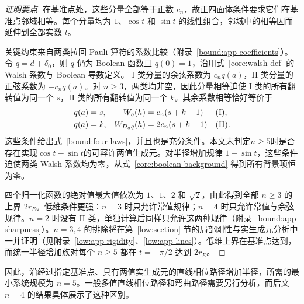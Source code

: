 \begin{proof}[证明要点]
在基准点处，这些分量全部等于正数 $c_n$，故正四面体条件要求它们在基准点邻域相等。每个分量均为 $1$、$\cos t$ 和 $\sin t$ 的线性组合，邻域中的相等因而延伸到全部实数 $t$。

关键约束来自两类拉回 Pauli 算符的系数比较（附录~\ref{bound:app-coefficients}）。令 $q=d+\delta_0$，则 $q$ 仍为 Boolean 函数且 $q(0)=1$，沿用式~\eqref{core:walsh-def} 的 Walsh 系数与 Boolean 导数定义。
I 类分量的余弦系数为 $c_nq(a)$，II 类分量的正弦系数为 $-c_nq(a)$。对 $n\ge3$，两类均非空，因此分量相等迫使 I 类的所有翻转值为同一个 $s$，II 类的所有翻转值为同一个 $k$。其余系数相等恰好等价于
\begin{equation}
 \begin{aligned}
 q(a)&=s,& W_q(h)&=c_n(s+k-1)&&({\rm I}),\\
 q(a)&=k,& W_{D_aq}(h)&=2c_n(s+k-1)&&({\rm II}).
 \end{aligned}
 \label{bound:conditions}
\end{equation}
这些条件给出式~\eqref{bound:four-laws}，并且也是充分条件。本文未判定$n\ge5$时是否存在实现$\cos t-\sin t$的可容许两值生成元。对半径增加规律 $1-\sin t$，这些条件迫使两类 Walsh 系数均为零，从式~\eqref{core:boolean-background} 得到所有背景项恒为零。

四个归一化函数的绝对值最大值依次为 $1$、$1$、$2$ 和 $\sqrt2$，由此得到全部 $n\ge3$ 的上界 $2r_E$。低维条件更强：$n=3$ 时只允许常值规律；$n=4$ 时只允许常值与余弦规律。$n=2$ 时没有 II 类，单独计算后同样只允许这两种规律（附录~\ref{bound:app-sharpness}）。$n=3,4$ 的排除将在第~\ref{low:section} 节的局部刚性与实生成元分析中一并证明（见附录~\ref{low:app-rigidity}、\ref{low:app-lines}）。低维上界在基准点达到，而统一半径增加族对每个 $n\ge5$ 都在 $t=-\pi/2$ 达到 $2r_E$。
\end{proof}

因此，沿经过指定基准点、具有两值实生成元的直线相位路径增加半径，所需的最小系统规模为 $n=5$。一般多值直线相位路径和弯曲路径需要另行分析，而后文 $n=4$ 的结果具体展示了这种区别。
